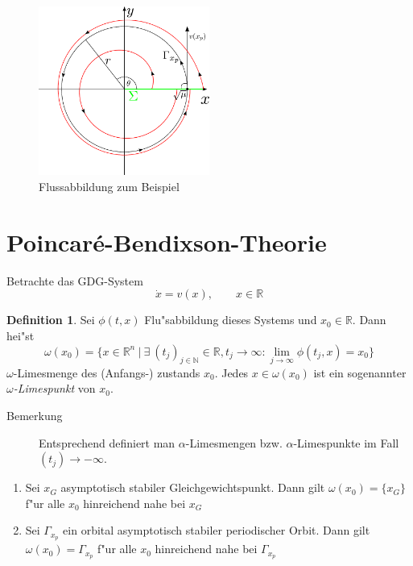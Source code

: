 \documentclass[a4paper, 13pt]{scrreprt}
\theoremstyle{definition} \newtheorem{definition}{Definition}[section]
\newenvironment{beispiel}[1][Beispiel]{\begin{trivlist}
\item[\hskip \labelsep {\bfseries #1}]}{\end{trivlist}}
\begin{document}
\begin{figure}[htpb]
		\centering
		\includegraphics[width=0.5\textwidth]{img/periodische_orbits/beispiel_asymp_stabilitaet.pdf}
		\caption{Flussabbildung zum Beispiel}
\end{figure}


\section{Poincar\'{e}-Bendixson-Theorie}

Betrachte das GDG-System
	\[\dot{x} = v(x), \qquad x \in\mathbb{R} \]
\begin{definition}
	Sei \(\phi(t,x)\) Flu"sabbildung dieses Systems und \(x_0 \in \mathbb{R}\). Dann hei"st
		\[\omega(x_0)= \{x \in \mathbb{R}^n\ |\ \exists\  (t_j)_{j \in \mathbb{N}} \in \mathbb{R}, t_j \to \infty : \lim_{j\to \infty} \phi(t_j,x) = x_0\} \]
	\(\omega\)-Limesmenge des (Anfangs-) zustands \(x_0\). Jedes \(x \in \omega(x_0)\) ist ein 		sogenannter \emph{\(\omega\)-Limespunkt} von \(x_0\).

\end{definition}
\begin{description}
	\item[Bemerkung] Entsprechend definiert man \(\alpha\)-Limesmengen bzw. \(\alpha\)-Limespunkte im Fall \((t_j) \to -\infty\).
\end{description}

\begin{beispiel}
	\begin{enumerate}
		\item Sei \(x_G\) asymptotisch stabiler Gleichgewichtspunkt. Dann gilt \(\omega(x_0) = \{x_G\} \) f"ur alle \(x_0\) hinreichend nahe bei \(x_G\)
		\item Sei \(\Gamma_{x_p} \) ein orbital asymptotisch stabiler periodischer Orbit. Dann gilt \(\omega(x_0)= \Gamma_{x_p}\) f"ur alle \(x_0\) hinreichend nahe bei \(\Gamma_{x_p}\)
	\end{enumerate}
\end{beispiel}
\end{document}
